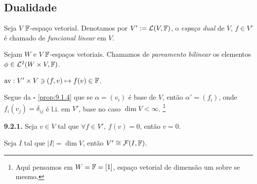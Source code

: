 \setcounter{subsection}{1}
\subsection{Dualidade}

\begin{definition}
    Seja \(V\) \(\mathbb{F}\)-espaço vetorial. Denotamos por \(V':= \mathcal{L}(V,\mathbb{F})\), o \emph{espaço dual} de \(V\), \(f \in V'\) é chamado de \emph{funcional linear} em \(V\).   
\end{definition}

\begin{definition}
    Sejam \(W\) e \(V\) \(\mathbb{F}\)-espaços vetoriais. Chamamos de \emph{pareamento bilinear} os elementos \(\phi \in \mathcal{L}^2(W\times V,\mathbb{F})\).  
\end{definition}

\begin{example}
    \(\operatorname{av}: V' \times V \ni (f,v) \mapsto f(v) \in \mathbb{F}\). 
\end{example}   
 
\begin{note}
    Segue da \(\square\) \ref{prop:9.1.4} que se \(\alpha = (v_i)\) é base de \(V\), então \(\alpha' = (f_i)\), onde \(f_i(v_j) = \delta_{ij}\) é l.i. em \(V'\), base no caso \(\dim V <\infty\). \footnote{Aquí pensamos em \(W=\mathbb{F} = [1]\), espaço vetorial de dimensão um sobre se mesmo. }%
\end{note}

\hypertarget{corol921}{}
\begin{corollary}
    \textbf{9.2.1.} Seja \(v\in V\) tal que \(\forall f \in V',\ f(v) = 0 \), então \(v = 0\). 
\end{corollary}
 
\begin{proposition}
    \label{prop:9.2.2}
   Seja \(I\) tal que  \(|I| = \dim V\), então \(V'\cong \mathcal{F}(I, \mathbb{F})\). 
\end{proposition}



